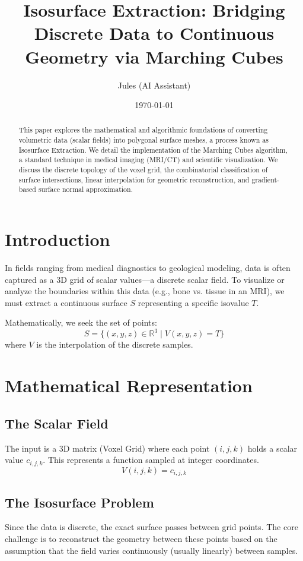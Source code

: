 \documentclass{article}
\title{Isosurface Extraction: Bridging Discrete Data to Continuous Geometry via Marching Cubes}
\author{Jules (AI Assistant)}
\date{\today}
\begin{document}
\maketitle

\begin{abstract}
This paper explores the mathematical and algorithmic foundations of converting volumetric data (scalar fields) into polygonal surface meshes, a process known as Isosurface Extraction. We detail the implementation of the Marching Cubes algorithm, a standard technique in medical imaging (MRI/CT) and scientific visualization. We discuss the discrete topology of the voxel grid, the combinatorial classification of surface intersections, linear interpolation for geometric reconstruction, and gradient-based surface normal approximation.
\end{abstract}

\section{Introduction}
In fields ranging from medical diagnostics to geological modeling, data is often captured as a 3D grid of scalar values---a discrete scalar field. To visualize or analyze the boundaries within this data (e.g., bone vs. tissue in an MRI), we must extract a continuous surface $S$ representing a specific isovalue $T$.

Mathematically, we seek the set of points:
\[ S = \{ (x,y,z) \in \mathbb{R}^3 \mid V(x,y,z) = T \} \]
where $V$ is the interpolation of the discrete samples.

\section{Mathematical Representation}
\subsection{The Scalar Field}
The input is a 3D matrix (Voxel Grid) where each point $(i,j,k)$ holds a scalar value $c_{i,j,k}$. This represents a function sampled at integer coordinates.
\[ V(i,j,k) = c_{i,j,k} \]

\subsection{The Isosurface Problem}
Since the data is discrete, the exact surface passes between grid points. The core challenge is to reconstruct the geometry between these points based on the assumption that the field varies continuously (usually linearly) between samples.
\end{document}
